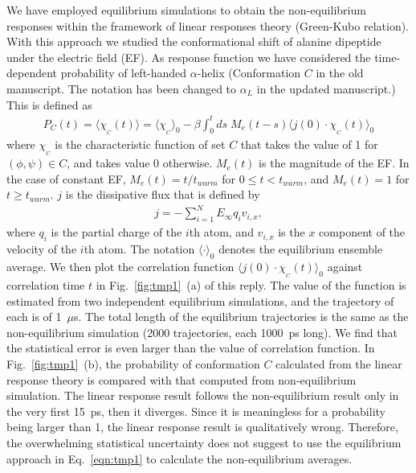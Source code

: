 \documentclass[]{revtex4-1}
\begin{document}
We have employed equilibrium simulations to obtain the non-equilibrium
responses within the framework of linear responses theory (Green-Kubo relation).
With this approach we studied the conformational shift of alanine dipeptide under the electric field
(EF). As response function we have considered the time-dependent probability of
left-handed $\alpha$-helix (Conformation $C$ in the old manuscript. The notation has been changed to $\alpha_L$ in the updated manuscript.) This is defined as
\begin{align}\label{eqn:tmp1}
  P_C(t) = \langle\chi_{_C}(t)\rangle = \langle \chi_{_C} \rangle_0 -
  \beta \int_0^t ds\; M_e(t - s)\langle j(0)\cdot \chi_{_C}(t) \rangle_0
\end{align}
where $\chi_{_C}$ is the characteristic function of set $C$ that takes
the value of 1 for $(\phi,\psi)\in C$, and takes value 0
otherwise. $M_e(t)$ is the magnitude of the EF. In the case of
constant EF, $M_e(t) = t/t_{warm}$ for $0\leq t<t_{warm}$, and
$M_e(t) = 1$ for $t\geq t_{warm}$.
$j$ is the dissipative flux that is defined by
\begin{align}
  j = - \sum_{i=1}^N E_\infty q_i v_{i,x},
\end{align}
where $q_i$ is the partial charge of the $i$th atom, and $v_{i,x}$ is
the $x$ component of the velocity of the $i$th atom.  The notation
$\langle\cdot\rangle_0$ denotes the equilibrium ensemble average.
 We then plot the correlation function
$\langle j(0)\cdot \chi_{_C}(t) \rangle_0$ against correlation time $t$
in Fig.~\ref{fig:tmp1}~(a) of this reply. The value of the function is estimated from
two independent equilibrium simulations, and the trajectory of each is
of 1~$\mu$s. The total length of the equilibrium
trajectories is the same as the non-equilibrium simulation (2000
trajectories, each 1000~ps long).
We find that the statistical error is even larger than the value of
correlation function.
In Fig.~\ref{fig:tmp1}~(b),
  the probability of conformation $C$ calculated from
  the linear response theory is compared with that
  computed from non-equilibrium simulation.
  The linear response result follows the non-equilibrium result only in the very first
  15~ps, then it diverges. Since it is meaningless for a probability
  being larger than 1, the linear response result is qualitatively wrong.
Therefore, the
overwhelming statistical uncertainty does not suggest to use the equilibrium approach 
in Eq.~\eqref{eqn:tmp1} to calculate the
non-equilibrium averages. 
\end{document}
